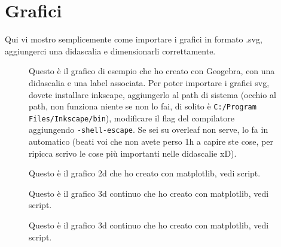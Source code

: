 \chapter{Grafici}
Qui vi mostro semplicemente come importare i grafici in formato .svg, aggiungerci una didascalia e dimensionarli correttamente.

\begin{figure}[!h]
	\centering
	\caption{Questo è il grafico di esempio che ho creato con Geogebra, con una didascalia e una label associata. Per poter importare i grafici svg, dovete installare inkscape, aggiungerlo al path di sistema (occhio al path, non funziona niente se non lo fai, di solito è \texttt{C:/Program Files/Inkscape/bin}), modificare il flag del compilatore aggiungendo \texttt{-shell-escape}. Se sei su overleaf non serve, lo fa in automatico (beati voi che non avete perso 1h a capire ste cose, per ripicca scrivo le cose più importanti nelle didascalie xD).}
	\label{graph:esempiografico}
\end{figure}

\hfill

\begin{figure}[!h]
	\centering
	\caption{Questo è il grafico 2d che ho creato con matplotlib, vedi script.}
	\label{graph:esempiograficopy}
\end{figure}

\hfill

\begin{figure}[!h]
	\centering
	\caption{Questo è il grafico 3d continuo che ho creato con matplotlib, vedi script.}
	\label{graph:esempiograficopy2}
\end{figure}

\hfill

\begin{figure}[!h]
	\centering
	\caption{Questo è il grafico 3d continuo che ho creato con matplotlib, vedi script.}
	\label{graph:esempiograficopy3}
\end{figure}

